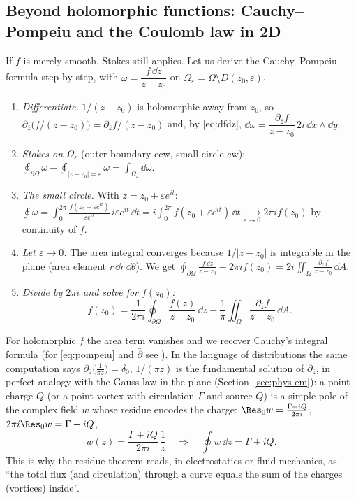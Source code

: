\subsection{Beyond holomorphic functions: Cauchy--Pompeiu and the Coulomb law in 2D}\label{sec:pompeiu}

If $f$ is merely smooth, Stokes still applies. Let us derive the Cauchy--Pompeiu formula step by step, with $\omega=\dfrac{f\,\dd z}{z-z_0}$ on $\Omega_\varepsilon=\Omega\setminus D(z_0,\varepsilon)$.
\begin{enumerate}
\item \emph{Differentiate.} $1/(z-z_0)$ is holomorphic away from $z_0$, so $\partial_{\bar z}\bigl(f/(z-z_0)\bigr)=\partial_{\bar z}f/(z-z_0)$ and, by \eqref{eq:dfdz}, $\dd\omega=\dfrac{\partial_{\bar z}f}{z-z_0}\,2i\,\dd x\wedge\dd y$.
\item \emph{Stokes on $\Omega_\varepsilon$} (outer boundary ccw, small circle cw): $\displaystyle\oint_{\partial\Omega}\omega-\oint_{|z-z_0|=\varepsilon}\omega=\int_{\Omega_\varepsilon}\dd\omega$.
\item \emph{The small circle.} With $z=z_0+\varepsilon e^{it}$: $\displaystyle\oint\omega=\int_0^{2\pi}\frac{f(z_0+\varepsilon e^{it})}{\varepsilon e^{it}}\,i\varepsilon e^{it}\,\dd t=i\int_0^{2\pi}f(z_0+\varepsilon e^{it})\,\dd t\xrightarrow[\varepsilon\to0]{}2\pi if(z_0)$ by continuity of $f$.
\item \emph{Let $\varepsilon\to0$.} The area integral converges because $1/|z-z_0|$ is integrable in the plane (area element $r\,\dd r\,\dd\theta$). We get $\displaystyle\oint_{\partial\Omega}\frac{f\,\dd z}{z-z_0}-2\pi if(z_0)=2i\iint_\Omega\frac{\partial_{\bar z}f}{z-z_0}\,\dd A$.
\item \emph{Divide by $2\pi i$ and solve for $f(z_0)$:}
\begin{equation}\label{eq:pompeiu}
f(z_0)=\frac1{2\pi i}\oint_{\partial\Omega}\frac{f(z)}{z-z_0}\,\dd z-\frac1\pi\iint_\Omega\frac{\partial_{\bar z}f}{z-z_0}\,\dd A .
\end{equation}
\end{enumerate}
For holomorphic $f$ the area term vanishes and we recover Cauchy's integral formula (for \eqref{eq:pompeiu} and $\bar\partial$ see \cite{Hormander}). In the language of distributions the same computation says $\partial_{\bar z}\bigl(\frac1{\pi z}\bigr)=\delta_0$, \ie $1/(\pi z)$ is the fundamental solution of $\partial_{\bar z}$, in perfect analogy with the Gauss law in the plane (Section~\ref{sec:phys-em}): a point charge $Q$ (or a point vortex with circulation $\Gamma$ and source $Q$) is a simple pole of the complex field $w$ whose residue encodes the charge: $\Res_0w=\frac{\Gamma+iQ}{2\pi i}$, \ie $2\pi i\Res_0w=\Gamma+iQ$,
\[
w(z)=\frac{\Gamma+iQ}{2\pi i}\,\frac1z\quad\Longrightarrow\quad\oint w\,\dd z=\Gamma+iQ .
\]
This is why the residue theorem reads, in electrostatics or fluid mechanics, as ``the total flux (and circulation) through a curve equals the sum of the charges (vortices) inside''.
